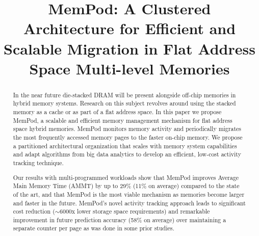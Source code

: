 \documentclass{sig-alternate}
\title {MemPod: A Clustered Architecture for Efficient and Scalable Migration in Flat Address Space Multi-level Memories}
\author{}
\begin{document}
\maketitle
\thispagestyle{firstpage}
\pagestyle{plain}

\begin{abstract}

%

In the near future die-stacked DRAM will be present alongside off-chip memories in hybrid memory systems. Research on this subject revolves around using the stacked memory as a cache or as part of a flat address space. In this paper we propose MemPod, a scalable and efficient memory management mechanism for flat address space hybrid memories. MemPod monitors memory activity and periodically migrates the most frequently accessed memory pages to the faster on-chip memory. We propose a partitioned architectural organization that scales with memory system capabilities and adapt algorithms from big data analytics to develop an efficient, low-cost activity tracking technique. 

Our results with multi-programmed workloads show that MemPod improves Average Main Memory Time (AMMT) by up to 29\% (11\% on average) compared to the state of the art, and that MemPod is the most viable mechanism as memories become larger and faster in the future. MemPod's novel activity tracking approach leads to significant cost reduction ($\sim$6000x lower storage space requirements) and remarkable improvement in future prediction accuracy (58\% on average) over maintaining a separate counter per page as was done in some prior studies. 

\end{abstract}
\end{document}
